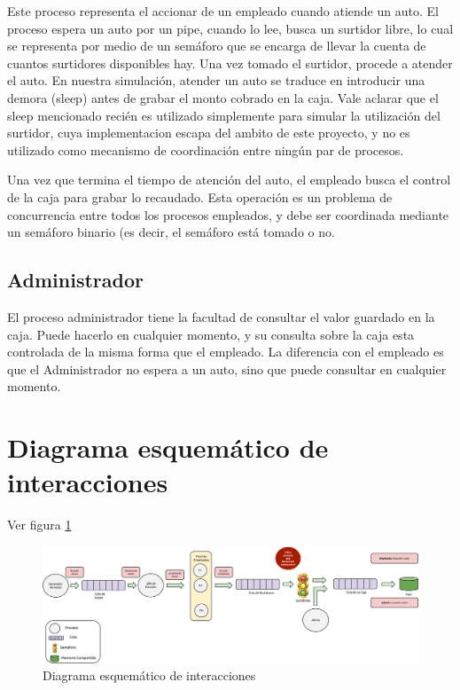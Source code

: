 \documentclass[12pt,a4paper,spanish]{article}
\begin{document}
	Este proceso representa el accionar de un empleado cuando atiende un auto. El proceso espera un auto por un pipe, cuando lo lee, busca un surtidor libre, lo cual se representa por medio de un semáforo que se encarga de llevar la cuenta de cuantos surtidores disponibles hay. Una vez tomado el surtidor, procede a atender el auto. En nuestra simulación, atender un auto se traduce en introducir una demora (sleep) antes de grabar el monto cobrado en la caja. Vale aclarar que el sleep mencionado recién es utilizado simplemente para simular la utilización del surtidor, cuya implementacion escapa del ambito de este proyecto, y no es utilizado como mecanismo de coordinación entre ningún par de procesos.
	
	Una vez que termina el tiempo de atención del auto, el empleado busca el control de la caja para grabar lo recaudado. Esta operación es un problema de concurrencia entre todos los procesos empleados, y debe ser coordinada mediante un semáforo binario (es decir, el semáforo está tomado o no.
	
	\subsection{Administrador}
	
	El proceso administrador tiene la facultad de consultar el valor guardado en la caja. Puede hacerlo en cualquier momento, y su consulta sobre la caja esta controlada de la misma forma que el empleado. La diferencia con el empleado es que el Administrador no espera a un auto, sino que puede consultar en cualquier momento.
	
	\section{Diagrama esquemático de interacciones}
	
	Ver figura \ref{diagrama}

\begin{figure}
\label{diagrama}
\includegraphics[width=1.0\textwidth]{esquema.png}
\caption{Diagrama esquemático de interacciones}
\end{figure}
\end{document}
